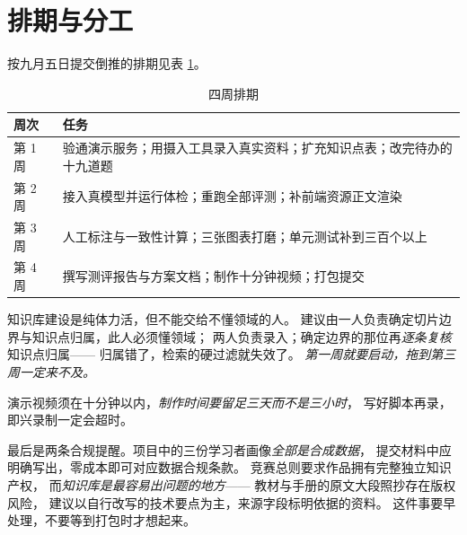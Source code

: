 \section{排期与分工}

按九月五日提交倒推的排期见表 \ref{tab:sched}。

\begin{table}[htbp]\centering\small
\caption{四周排期}\label{tab:sched}
\begin{tabular}{@{}p{1.8cm}p{10cm}@{}}
\toprule
周次 & 任务 \\
\midrule
第 1 周 & 验通演示服务；用摄入工具录入真实资料；扩充知识点表；改完待办的十九道题 \\
第 2 周 & 接入真模型并运行体检；重跑全部评测；补前端资源正文渲染 \\
第 3 周 & 人工标注与一致性计算；三张图表打磨；单元测试补到三百个以上 \\
第 4 周 & 撰写测评报告与方案文档；制作十分钟视频；打包提交 \\
\bottomrule
\end{tabular}
\end{table}

知识库建设是纯体力活，但不能交给不懂领域的人。
建议由一人负责确定切片边界与知识点归属，此人必须懂领域；
两人负责录入；确定边界的那位再\emph{逐条复核}知识点归属——
归属错了，检索的硬过滤就失效了。
\emph{第一周就要启动，拖到第三周一定来不及。}

演示视频须在十分钟以内，\emph{制作时间要留足三天而不是三小时}，
写好脚本再录，即兴录制一定会超时。

最后是两条合规提醒。项目中的三份学习者画像\emph{全部是合成数据}，
提交材料中应明确写出，零成本即可对应数据合规条款。
竞赛总则要求作品拥有完整独立知识产权，
而\emph{知识库是最容易出问题的地方}——
教材与手册的原文大段照抄存在版权风险，
建议以自行改写的技术要点为主，来源字段标明依据的资料。
这件事要早处理，不要等到打包时才想起来。




